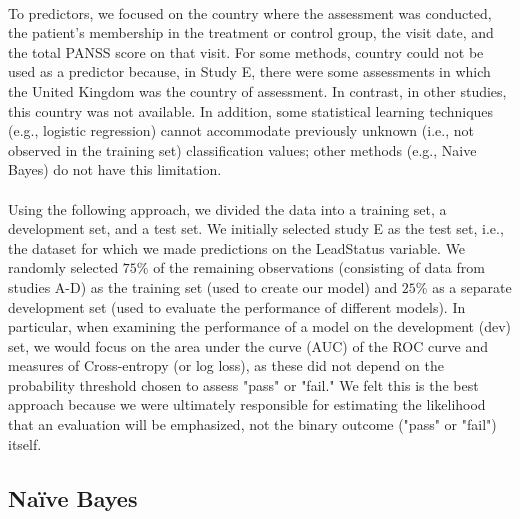 \documentclass{article}
\begin{document}
	\paragraph{}To predictors, we focused on the country where the assessment was conducted, the patient's membership in the treatment or control group, the visit date, and the total PANSS score on that visit. For some methods, country could not be used as a predictor because, in Study E, there were some assessments in which the United Kingdom was the country of assessment. In contrast, in other studies, this country was not available. In addition, some statistical learning techniques (e.g., logistic regression) cannot accommodate previously unknown (i.e., not observed in the training set) classification values; other methods (e.g., Naive Bayes) do not have this limitation.

	\paragraph{}Using the following approach, we divided the data into a training set, a development set, and a test set. We initially selected study E as the test set, i.e., the dataset for which we made predictions on the LeadStatus variable. We randomly selected $75 \%$
of the remaining observations (consisting of data from studies A-D) as the training set (used to create our model) and $25 \%$  as a separate development set (used to evaluate the performance of different models). In particular, when examining the performance of a model on the development (dev) set, we would focus on the area under the curve (AUC) of the ROC curve and measures of Cross-entropy (or log loss), as these did not depend on the probability threshold chosen to assess "pass" or "fail." We felt this is the best approach because we were ultimately responsible for estimating the likelihood that an evaluation will be emphasized, not the binary outcome ("pass" or "fail") itself.

	\subsection{Naïve Bayes}
\end{document}
